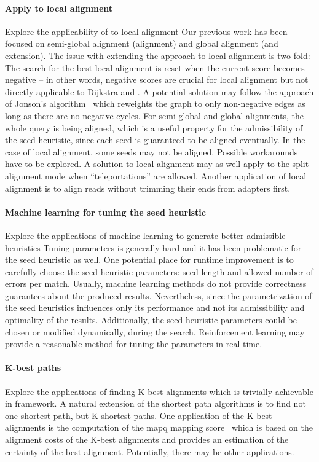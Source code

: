 \paragraph{Apply \A to local alignment}
Explore the applicability of \A to local alignment Our previous work has been
focused on semi-global alignment (alignment) and global alignment (and
extension). The issue with extending the \A approach to local alignment is
two-fold: The search for the best local alignment is reset when the current
score becomes negative – in other words, negative scores are crucial for local
alignment but not directly applicable to Dijkstra and \A. A potential solution
may follow the approach of Jonson's algorithm~\citep{johnson1977efficient} which
reweights the graph to only non-negative edges as long as there are no negative
cycles. For semi-global and global alignments, the whole query is being aligned,
which is a useful property for the admissibility of the seed heuristic, since
each seed is guaranteed to be aligned eventually. In the case of local
alignment, some seeds may not be aligned. Possible workarounds have to be
explored. A solution to local alignment may as well apply to the split alignment
mode when ``teleportations'' are allowed. Another application of local alignment
is to align reads without trimming their ends from adapters first.

\paragraph{Machine learning for tuning the seed heuristic}
Explore the applications of machine learning to generate better admissible
heuristics Tuning parameters is generally hard and it has been problematic for
the seed heuristic as well. One potential place for runtime improvement is to
carefully choose the seed heuristic parameters: seed length and allowed number
of errors per match. Usually, machine learning methods do not provide correctness
guarantees about the produced results. Nevertheless, since the parametrization
of the seed heuristics influences only its performance and not its admissibility
and optimality of the results. Additionally, the seed heuristic parameters could
be chosen or modified dynamically, during the \A search. Reinforcement learning
may provide a reasonable method for tuning the parameters in real time.

\paragraph{K-best paths}
Explore the applications of finding K-best alignments which is trivially
achievable in \A framework. A natural extension of the shortest path algorithms
is to find not one shortest path, but K-shortest paths. One application of the
K-best alignments is the computation of the mapq mapping
score~\citep{li2008mapping} which is based on the alignment costs of the K-best
alignments and provides an estimation of the certainty of the best alignment.
Potentially, there may be other applications.

